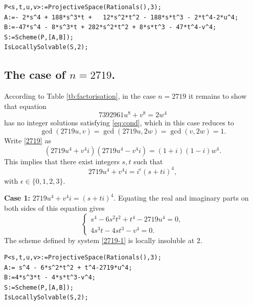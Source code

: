 \documentclass[a4paper,12pt,english,reqno]{amsart}
\begin{document}

\begin{lstlisting}
P<s,t,u,v>:=ProjectiveSpace(Rationals(),3);
A:=- 2*s^4 + 188*s^3*t +   12*s^2*t^2 - 188*s*t^3 - 2*t^4-2*u^4;
B:=-47*s^4 - 8*s^3*t + 282*s^2*t^2 + 8*s*t^3 - 47*t^4-v^4;
S:=Scheme(P,[A,B]);
IsLocallySolvable(S,2);
\end{lstlisting}

\subsection{The case of $n=2719$.}%
According to Table \ref{tb:factorisation}, in the case $n=2719$ it remains to
show that equation 
\begin{equation}\label{2719}
7392961 u^8 + v^8 =2  w^4
\end{equation}
has no integer solutions satisfying \eqref{eq:cond}, which in this case reduces to
\begin{equation}\label{2719:cond}
\gcd(2719u,v)=\gcd(2719u,2w)=\gcd(v,2w)=1.
\end{equation}  Write \eqref{2719} as
\begin{equation} (2719u^4+v^4i)(2719u^4-v^4i)=(1+i)(1-i)w^4.
\end{equation}
This implies that there exist integers $s,t$ such that 
\[2719u^4+v^4i=i^{\epsilon}(s+ti)^4,\]
with $\epsilon \in \{0,1,2,3\}$.


{\bf Case 1:} $2719u^4+v^4i=(s+ti)^4$. Equating the real and imaginary parts on both sides of this equation gives
\begin{equation}\label{2719-1}
\begin{cases}
s^4 - 6s^2t^2 + t^4 - 2719u^4=0,\\
4s^3t - 4st^3 - v^4=0.
\end{cases}
\end{equation}
The scheme defined by system \eqref{2719-1} is locally insoluble at $2$.


\begin{lstlisting}
P<s,t,u,v>:=ProjectiveSpace(Rationals(),3);
A:= s^4 - 6*s^2*t^2 + t^4-2719*u^4;
B:=4*s^3*t - 4*s*t^3-v^4;
S:=Scheme(P,[A,B]);
IsLocallySolvable(S,2);
\end{lstlisting}
\end{document}
